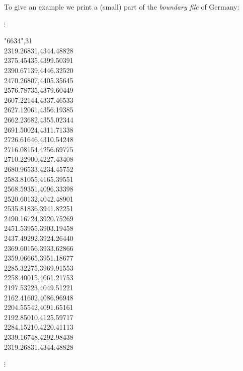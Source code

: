 To give an example we print a (small) part of the {\em boundary
file} of Germany:

\begin{multicols}{3}
\footnotesize

\hspace{1cm}  $\vdots$

"6634",31 \\
2319.26831,4344.48828 \\
2375.45435,4399.50391 \\
2390.67139,4446.32520 \\
2470.26807,4405.35645 \\
2576.78735,4379.60449 \\
2607.22144,4337.46533 \\
2627.12061,4356.19385 \\
2662.23682,4355.02344 \\
2691.50024,4311.71338 \\
2726.61646,4310.54248 \\
2716.08154,4256.69775 \\
2710.22900,4227.43408 \\
2680.96533,4234.45752 \\
2583.81055,4165.39551 \\
2568.59351,4096.33398 \\
2520.60132,4042.48901 \\
2535.81836,3941.82251 \\
2490.16724,3920.75269 \\
2451.53955,3903.19458 \\
2437.49292,3924.26440 \\
2369.60156,3933.62866 \\
2359.06665,3951.18677 \\
2285.32275,3969.91553 \\
2258.40015,4061.21753 \\
2197.53223,4049.51221 \\
2162.41602,4086.96948 \\
2204.55542,4091.65161 \\
2192.85010,4125.59717 \\
2284.15210,4220.41113 \\
2339.16748,4292.98438 \\
2319.26831,4344.48828

\hspace{1cm} $\vdots$

\end{multicols}
\normalsize

